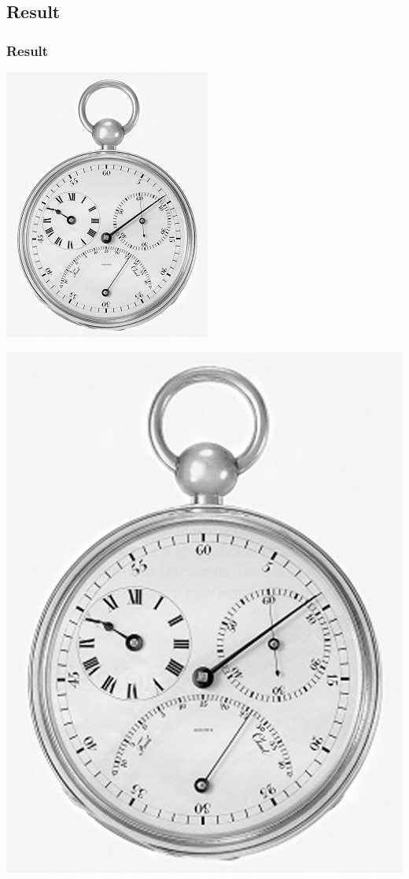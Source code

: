 \documentclass[notheorems,serif,table,compress]{beamer}  %
\begin{document}
\subsection*{Result}
\begin{frame}
\frametitle{Result}
	\begin{minipage}[t]{0.4\linewidth}
        \centering
        \includegraphics[width=0.5\linewidth]{1.jpg} 
        \end{minipage}
	\begin{minipage}[t]{0.4\linewidth}
        \centering
        \includegraphics[width=1\linewidth]{Bicubic.jpg} 
        \end{minipage}
\end{frame}
\end{document}

